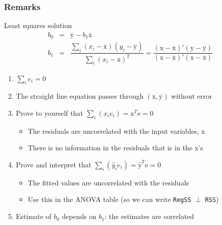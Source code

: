 \begin{frame}\frametitle{Remarks}
	\begin{block}{Least squares solution}
		$$
			\begin{array}{rcl}
				b_0 &=& \overline{\mathrm{y}} - b_1\overline{\mathrm{x}} \\
				b_1 &=& \dfrac{ \sum_i{\left(x_i - \overline{\mathrm{x}}\right)\left(y_i - \overline{\mathrm{y}}\right) } }{ \sum_i{\left( x_i - \overline{\mathrm{x}}\right)^2} } = \dfrac{\left(\mathrm{x} - \overline{\mathrm{x}}\right)'\left(\mathrm{y} - \overline{\mathrm{y}}\right)}{\left(\mathrm{x} - \overline{\mathrm{x}}\right)'\left(\mathrm{x} - \overline{\mathrm{x}}\right)}
			\end{array}
		$$
	\end{block}
	\begin{enumerate}
		\item	$\sum_i{e_i} = 0$
		\item	The straight line equation passes through $(\overline{\mathrm{x}}, \overline{\mathrm{y}})$ without error
		\item	Prove to yourself that $\sum_i{(x_i e_i)} = \mathrm{x}^T\mathrm{e} = 0$
		\begin{itemize}
			\item	The residuals are uncorrelated with the input variables, $\mathrm{x}$
			\item	There is no information in the residuals that is in the $\mathrm{x}$'s
		\end{itemize}
		\item	Prove and interpret that $\sum_i{(\hat{y}_i e_i)} = \hat{\mathrm{y}}^T\mathrm{e} = 0$
		\begin{itemize}
			\item	The fitted values are uncorrelated with the residuals
			\item	Use this in the ANOVA table (so we can write \texttt{RegSS} $\perp$ \texttt{RSS})
		\end{itemize}
		\item	Estimate of $b_0$ depends on $b_1$: the estimates are correlated
	\end{enumerate}
\end{frame}


